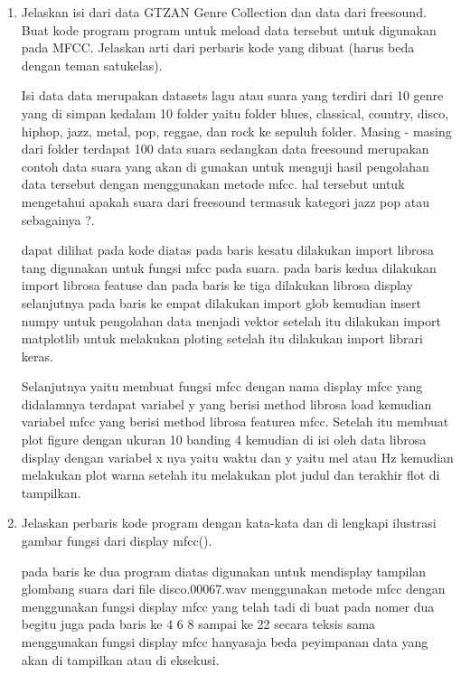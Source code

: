 \begin{enumerate}
    \item Jelaskan isi dari data GTZAN Genre Collection dan data dari freesound. Buat kode program program untuk meload data tersebut untuk digunakan pada MFCC. Jelaskan arti dari perbaris kode yang dibuat (harus beda dengan teman satukelas).\par
    \subitem Isi data data merupakan datasets lagu atau suara yang terdiri dari 10 genre yang di simpan kedalam 10 folder yaitu folder blues, classical, country, disco, hiphop, jazz, metal, pop, reggae, dan rock ke sepuluh folder. Masing - masing dari folder terdapat 100 data suara sedangkan data freesound merupakan contoh data suara yang akan di gunakan untuk menguji hasil pengolahan data tersebut dengan menggunakan metode mfcc. hal tersebut untuk mengetahui apakah suara dari freesound termasuk kategori jazz pop atau sebagainya ?.
    
    
    \subitem dapat dilihat pada kode diatas pada baris kesatu dilakukan import librosa tang digunakan untuk fungsi mfcc pada suara.
    pada baris kedua dilakukan import librosa featuse dan pada baris ke tiga dilakukan librosa display selanjutnya pada baris ke empat dilakukan import glob kemudian insert numpy untuk pengolahan data menjadi vektor setelah itu dilakukan import matplotlib untuk melakukan ploting setelah itu dilakukan import librari keras.\par
    
    \subitem Selanjutnya yaitu membuat fungsi mfcc dengan nama display mfcc yang didalamnya terdapat variabel y yang berisi method librosa load kemudian variabel mfcc yang berisi method librosa featurea mfcc. Setelah itu membuat plot figure dengan ukuran 10 banding 4 kemudian di isi oleh data librosa display dengan variabel x nya yaitu waktu dan y yaitu mel atau Hz kemudian melakukan plot warna setelah itu melakukan plot judul dan terakhir flot di tampilkan. 
    
    \item Jelaskan perbaris kode program dengan kata-kata dan di lengkapi ilustrasi gambar fungsi dari display mfcc().\par
    
    
    
    \subitem pada baris ke dua program diatas digunakan untuk mendisplay tampilan glombang suara dari file disco.00067.wav menggunakan metode mfcc dengan menggunakan fungsi display mfcc yang telah tadi di buat pada nomer dua begitu juga pada baris ke 4 6 8 sampai ke 22 secara teksis sama menggunakan fungsi display mfcc hanyasaja beda peyimpanan data yang akan di tampilkan atau di eksekusi. 
    

\end{enumerate}
